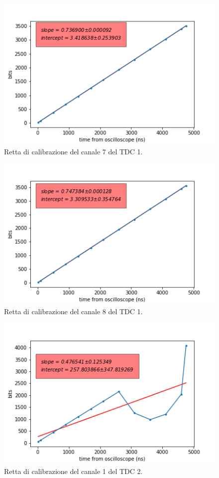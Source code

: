 \begin{figure}[H]
  \centering
  \includegraphics[width=.8\textwidth]{plots/tdc17.png}
  \caption{Retta di calibrazione del canale 7 del TDC 1.}
  \label{fig:tdc17}
\end{figure}

\begin{figure}[H]
  \centering
  \includegraphics[width=.8\textwidth]{plots/tdc18.png}
  \caption{Retta di calibrazione del canale 8 del TDC 1.}
  \label{fig:tdc18}
\end{figure}

\begin{figure}[H]
  \centering
  \includegraphics[width=.8\textwidth]{plots/tdc21.png}
  \caption{Retta di calibrazione del canale 1 del TDC 2.}
  \label{fig:tdc21}
\end{figure}

